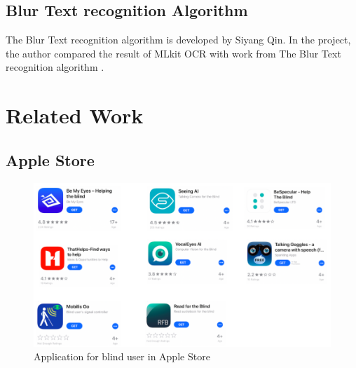 \documentclass[11pt]{ucscthesis}
\begin{document}
\section{Blur Text recognition Algorithm}
The Blur Text recognition algorithm \cite{qin2016fast} is developed by Siyang Qin. In the project, the author compared the result of MLkit OCR with work from The Blur Text recognition algorithm \cite{qin2016fast}.




\chapter{Related Work}
\section{Apple Store}
\begin{figure}
    \centering
    \includegraphics[width =0.8\linewidth]{Fig/AppleBlind.png}
    \caption{Application for blind user in Apple Store}
    \label{Application for blind user in Google Play Store}
\end{figure}
\end{document}
